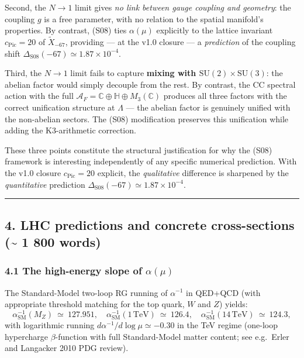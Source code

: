\documentclass[
  11pt,
  a4paper,
]{article}
\begin{document}
Second, the \(N \to 1\) limit gives \emph{no link between gauge coupling and geometry}: the coupling \(g\) is a free parameter, with no relation to the spatial manifold's properties. By contrast, (S08) ties \(\alpha(\mu)\) explicitly to the lattice invariant \(c_{\mathrm{Pic}} = 20\) of \(\tilde X_{-67}\), providing --- at the v1.0 closure --- a \emph{prediction} of the coupling shift \(\Delta_{\mathrm{S08}}(-67) \simeq 1.87 \times 10^{-4}\).

Third, the \(N \to 1\) limit fails to capture \textbf{mixing with \(\mathrm{SU}(2) \times \mathrm{SU}(3)\)}: the abelian factor would simply decouple from the rest. By contrast, the CC spectral action with the full \(\mathcal A_F = \mathbb C \oplus \mathbb H \oplus M_3(\mathbb C)\) produces all three factors with the correct unification structure at \(\Lambda\) --- the abelian factor is genuinely unified with the non-abelian sectors. The (S08) modification preserves this unification while adding the K3-arithmetic correction.

These three points constitute the structural justification for why the (S08) framework is interesting independently of any specific numerical prediction. With the v1.0 closure \(c_{\mathrm{Pic}} = 20\) explicit, the \emph{qualitative} difference is sharpened by the \emph{quantitative} prediction \(\Delta_{\mathrm{S08}}(-67) \simeq 1.87 \times 10^{-4}\).

\begin{center}\rule{0.5\linewidth}{0.5pt}\end{center}

\hypertarget{lhc-predictions-and-concrete-cross-sections-1-800-words}{%
\subsection{4. LHC predictions and concrete cross-sections (\textasciitilde{} 1 800 words)}\label{lhc-predictions-and-concrete-cross-sections-1-800-words}}

\hypertarget{the-high-energy-slope-of-alphamu}{%
\subsubsection{\texorpdfstring{4.1 The high-energy slope of \(\alpha(\mu)\)}{4.1 The high-energy slope of \textbackslash alpha(\textbackslash mu)}}\label{the-high-energy-slope-of-alphamu}}

The Standard-Model two-loop RG running of \(\alpha^{-1}\) in QED+QCD (with appropriate threshold matching for the top quark, \(W\) and \(Z\)) yields:
\[
\alpha^{-1}_{\mathrm{SM}}(M_Z)\ \simeq\ 127.951,\quad
\alpha^{-1}_{\mathrm{SM}}(1\,\mathrm{TeV})\ \simeq\ 126.4,\quad
\alpha^{-1}_{\mathrm{SM}}(14\,\mathrm{TeV})\ \simeq\ 124.3,
\]
with logarithmic running \(d\alpha^{-1}/d\log\mu \simeq -0.30\) in the TeV regime (one-loop hypercharge \(\beta\)-function with full Standard-Model matter content; see e.g.~Erler and Langacker 2010 PDG review).
\end{document}
